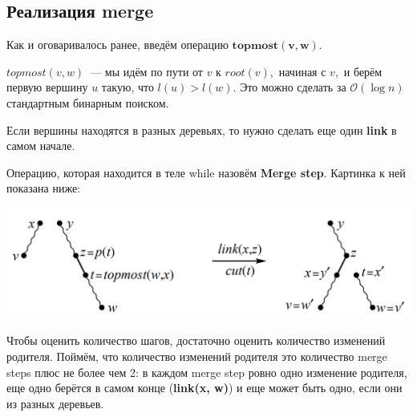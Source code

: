 \subsection{Реализация merge}
Как и оговаривалось ранее, введём операцию $\mathbf{topmost(v, w)}.$

$topmost(v,w)$~--- мы идём по пути от $v$ к $root(v),$ начиная с $v,$ и берём первую вершину $u$ такую, что $l(u) > l(w).$ Это можно сделать за $\mathcal{O}(\log{n})$ стандартным бинарным поиском.

\begin{algorithmic}[1]
            \State \Return {}
        
        \Else 
            \EndIf
            \EndIf
            \EndWhile
        \EndIf
    \EndProcedure
            
\end{algorithmic}
Если вершины находятся в разных деревьях, то нужно сделать еще один \textbf{link} в самом начале.

Операцию, которая находится в теле while назовём \textbf{Merge step}. Картинка к ней показана ниже:
\begin{center}
    \includegraphics[scale = 0.4]{mergestep.png}
\end{center}

Чтобы оценить количество шагов, достаточно оценить количество изменений родителя. Поймём, что количество изменений родителя это количество merge steps плюс не более чем 2: в каждом merge step ровно одно изменение родителя, еще одно берётся в самом конце (\textbf{link(x, w)}) и еще может быть одно, если они из разных деревьев.


